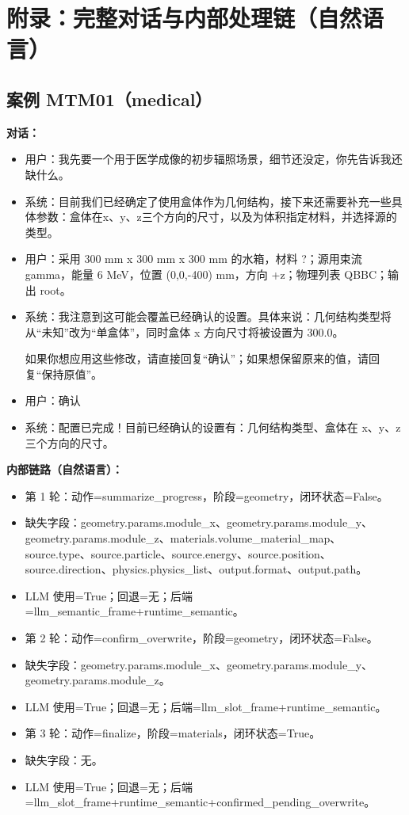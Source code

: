 \documentclass[11pt]{ctexart}
\begin{document}
\section{附录：完整对话与内部处理链（自然语言）}
\subsection{案例 MTM01（medical）}
\textbf{对话：}
\begin{itemize}
\item 用户：我先要一个用于医学成像的初步辐照场景，细节还没定，你先告诉我还缺什么。
\item 系统：目前我们已经确定了使用盒体作为几何结构，接下来还需要补充一些具体参数：盒体在x、y、z三个方向的尺寸，以及为体积指定材料，并选择源的类型。
\item 用户：采用 300 mm x 300 mm x 300 mm 的水箱，材料 ?；源用束流 gamma，能量 6 MeV，位置 (0,0,-400) mm，方向 +z；物理列表 QBBC；输出 root。
\item 系统：我注意到这可能会覆盖已经确认的设置。具体来说：几何结构类型将从“未知”改为“单盒体”，同时盒体 x 方向尺寸将被设置为 300.0。

如果你想应用这些修改，请直接回复“确认”；如果想保留原来的值，请回复“保持原值”。
\item 用户：确认
\item 系统：配置已完成！目前已经确认的设置有：几何结构类型、盒体在 x、y、z 三个方向的尺寸。
\end{itemize}
\textbf{内部链路（自然语言）：}
\begin{itemize}
\item 第 1 轮：动作=summarize\_progress，阶段=geometry，闭环状态=False。
\item 缺失字段：geometry.params.module\_x、geometry.params.module\_y、geometry.params.module\_z、materials.volume\_material\_map、source.type、source.particle、source.energy、source.position、source.direction、physics.physics\_list、output.format、output.path。
\item LLM 使用=True；回退=无；后端=llm\_semantic\_frame+runtime\_semantic。
\item 第 2 轮：动作=confirm\_overwrite，阶段=geometry，闭环状态=False。
\item 缺失字段：geometry.params.module\_x、geometry.params.module\_y、geometry.params.module\_z。
\item LLM 使用=True；回退=无；后端=llm\_slot\_frame+runtime\_semantic。
\item 第 3 轮：动作=finalize，阶段=materials，闭环状态=True。
\item 缺失字段：无。
\item LLM 使用=True；回退=无；后端=llm\_slot\_frame+runtime\_semantic+confirmed\_pending\_overwrite。
\end{itemize}
\end{document}
